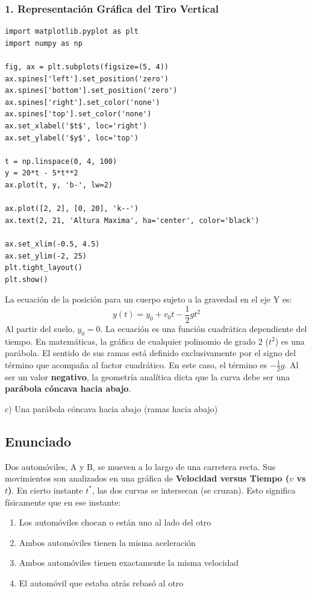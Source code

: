 \documentclass[12pt, a4paper]{article}
\begin{document}
\subsubsection*{1. Representación Gráfica del Tiro Vertical}

\begin{lstlisting}
import matplotlib.pyplot as plt
import numpy as np

fig, ax = plt.subplots(figsize=(5, 4))
ax.spines['left'].set_position('zero')
ax.spines['bottom'].set_position('zero')
ax.spines['right'].set_color('none')
ax.spines['top'].set_color('none')
ax.set_xlabel('$t$', loc='right')
ax.set_ylabel('$y$', loc='top')

t = np.linspace(0, 4, 100)
y = 20*t - 5*t**2
ax.plot(t, y, 'b-', lw=2)

ax.plot([2, 2], [0, 20], 'k--')
ax.text(2, 21, 'Altura Maxima', ha='center', color='black')

ax.set_xlim(-0.5, 4.5)
ax.set_ylim(-2, 25)
plt.tight_layout()
plt.show()
\end{lstlisting}

La ecuación de la posición para un cuerpo sujeto a la gravedad en el eje Y es:
$$ y(t) = y_0 + v_0 t - \frac{1}{2}g t^2 $$
Al partir del suelo, $y_0 = 0$. La ecuación es una función cuadrática dependiente del tiempo. 
En matemáticas, la gráfica de cualquier polinomio de grado 2 ($t^2$) es una parábola. El sentido de sus ramas está definido exclusivamente por el signo del término que acompaña al factor cuadrático.
En este caso, el término es $-\frac{1}{2}g$. Al ser un valor \textbf{negativo}, la geometría analítica dicta que la curva debe ser una \textbf{parábola cóncava hacia abajo}. 

\begin{tcolorbox}[colback=green!5!white, colframe=green!50!black, title=Respuesta Final]
\centering \Large c) Una parábola cóncava hacia abajo (ramas hacia abajo)
\end{tcolorbox}

\newpage

\subsection*{Enunciado}
Dos automóviles, A y B, se mueven a lo largo de una carretera recta. Sus movimientos son analizados en una gráfica de \textbf{Velocidad versus Tiempo ($v$ vs $t$)}. En cierto instante $t^*$, las dos curvas se intersecan (se cruzan). Esto significa físicamente que en ese instante:
\begin{enumerate}[label=\alph*)]
    \item Los automóviles chocan o están uno al lado del otro
    \item Ambos automóviles tienen la misma aceleración
    \item Ambos automóviles tienen exactamente la misma velocidad
    \item El automóvil que estaba atrás rebasó al otro
\end{enumerate}
\end{document}
